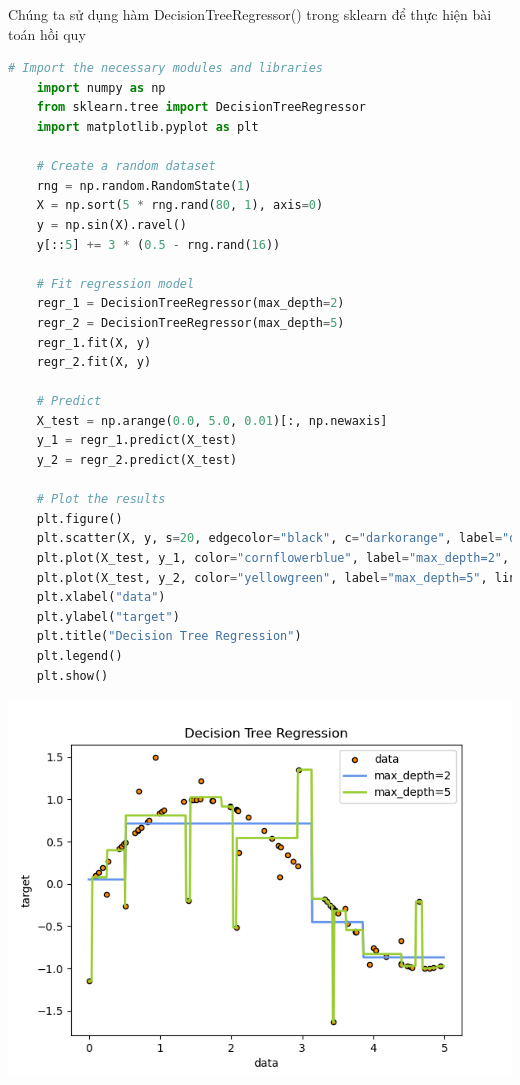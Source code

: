 \documentclass[lineno]{biometrika}
\begin{document}
Chúng ta sử dụng hàm DecisionTreeRegressor() trong sklearn để thực hiện bài toán hồi quy 
    \begin{lstlisting}[language=Python]
    # Import the necessary modules and libraries
    import numpy as np
    from sklearn.tree import DecisionTreeRegressor
    import matplotlib.pyplot as plt
    
    # Create a random dataset
    rng = np.random.RandomState(1)
    X = np.sort(5 * rng.rand(80, 1), axis=0)
    y = np.sin(X).ravel()
    y[::5] += 3 * (0.5 - rng.rand(16))
    
    # Fit regression model
    regr_1 = DecisionTreeRegressor(max_depth=2)
    regr_2 = DecisionTreeRegressor(max_depth=5)
    regr_1.fit(X, y)
    regr_2.fit(X, y)
    
    # Predict
    X_test = np.arange(0.0, 5.0, 0.01)[:, np.newaxis]
    y_1 = regr_1.predict(X_test)
    y_2 = regr_2.predict(X_test)
    
    # Plot the results
    plt.figure()
    plt.scatter(X, y, s=20, edgecolor="black", c="darkorange", label="data")
    plt.plot(X_test, y_1, color="cornflowerblue", label="max_depth=2", linewidth=2)
    plt.plot(X_test, y_2, color="yellowgreen", label="max_depth=5", linewidth=2)
    plt.xlabel("data")
    plt.ylabel("target")
    plt.title("Decision Tree Regression")
    plt.legend()
    plt.show()
    \end{lstlisting}
    \includegraphics{regression}
\end{document}
